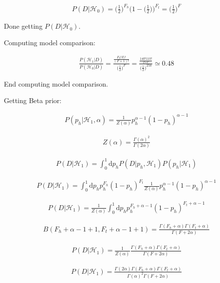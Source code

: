 \documentclass[12pt]{article}
\begin{document}
\begin{gather}
P(D|\mathcal{H}_0) = \Big(\frac{1}{2}\Big)^{F_h}\Big(1 - \Big(\frac{1}{2}\Big)\Big)^{F_t} = \Big(\frac{1}{2}\Big)^{F}
\end{gather}


Done getting $P(D|\mathcal{H}_0)$.

Computing model comparison:

\begin{gather}
\frac{P(\mathcal{H}_1 | D)}{P(\mathcal{H}_0 | D)} = \frac{\frac{F_h!F_t!}{(F+1)!}}{\Big(\frac{1}{2}\Big)^{F}} =  \frac{\frac{140!110!}{251!}}{\Big(\frac{1}{2}\Big)^{250}} \simeq 0.48
\end{gather}

End computing model comparison.

Getting Beta prior:

\begin{gather}
P(p_h|\mathcal{H}_1,\alpha) = \frac{1}{Z(\alpha)}   p_h^{\alpha-1}(1-p_h)^{\alpha-1}
\end{gather}

\begin{gather}
Z(\alpha) = \frac{\Gamma(\alpha)^2}{\Gamma(2\alpha)}
\end{gather}

\begin{gather}
P(D|\mathcal{H}_1) = \int_0^1 \! \mathrm{d}p_h P(D|p_h,\mathcal{H}_1)P(p_h|\mathcal{H}_1)
\end{gather}

\begin{gather}
P(D|\mathcal{H}_1) = \int_0^1 \! \mathrm{d}p_h p_h^{F_h}(1 - p_h)^{F_t} \frac{1}{Z(\alpha)}   p_h^{\alpha-1}(1-p_h)^{\alpha-1}
\end{gather}

\begin{gather}
P(D|\mathcal{H}_1) = \frac{1}{Z(\alpha)}   \int_0^1 \! \mathrm{d}p_h p_h^{F_h+\alpha-1}(1 - p_h)^{F_t+\alpha-1}
\end{gather}

\begin{gather}
B(F_h+\alpha-1+1,F_t+\alpha-1+1) = \frac{\Gamma(F_h+\alpha)\Gamma(F_t+\alpha)}{\Gamma(F+2\alpha)}
\end{gather}

\begin{gather}
P(D|\mathcal{H}_1) = \frac{1}{Z(\alpha)} \frac{\Gamma(F_h+\alpha)\Gamma(F_t+\alpha)}{\Gamma(F+2\alpha)}
\end{gather}

\begin{gather}
P(D|\mathcal{H}_1) = \frac{\Gamma(2\alpha)\Gamma(F_h+\alpha)\Gamma(F_t+\alpha)}{\Gamma(\alpha)^2\Gamma(F+2\alpha)}
\end{gather}
\end{document}
